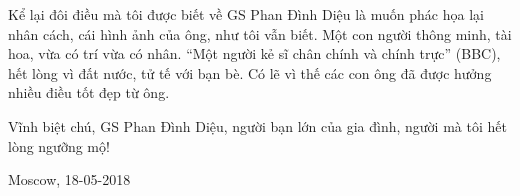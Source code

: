  

Kể lại đôi điều mà tôi được biết về GS Phan Đình Diệu là muốn phác họa lại nhân cách, cái hình ảnh của ông, như tôi vẫn biết. Một con người thông minh, tài hoa, vừa có trí vừa có nhân. “Một người kẻ sĩ chân chính và chính trực” (BBC), hết lòng vì đất nước, tử tế với bạn bè. Có lẽ vì thế các con ông đã được hưởng nhiều điều tốt đẹp từ ông.

 

Vĩnh biệt chú, GS Phan Đình Diệu, người bạn lớn của gia đình, người mà tôi hết lòng ngưỡng mộ!

 

Moscow, 18-05-2018